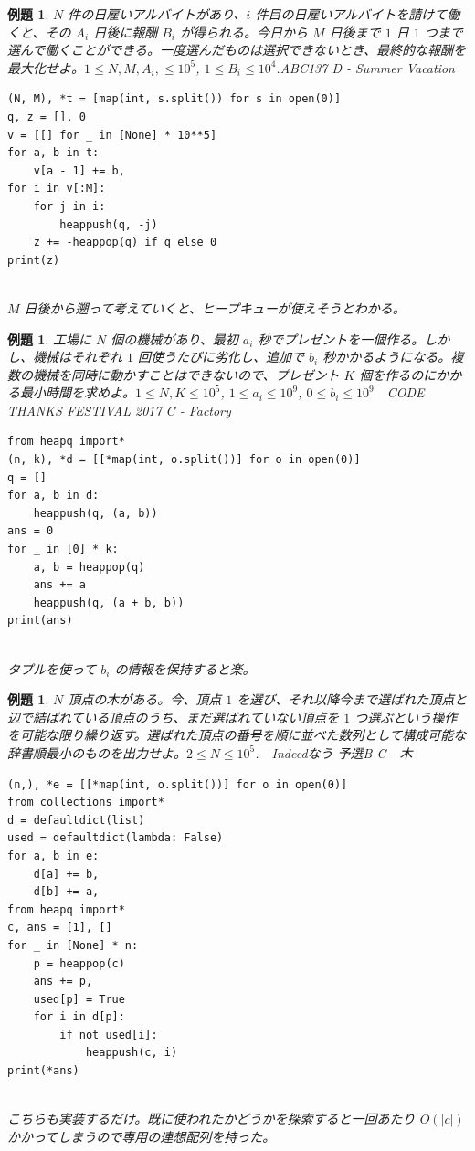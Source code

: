 \documentclass[12pt, a4j]{ltjsarticle}
\newtheorem{exm}[thm]{例題}
\newcommand*{\SS}{\vspace{1cm}}
\begin{document}
\SS

\begin{exm} \upshape$N$ 件の日雇いアルバイトがあり、$i$ 件目の日雇いアルバイトを請けて働くと、その $A_i$ 日後に報酬 $B_i$ が得られる。今日から $M$ 日後まで $1$ 日 $1$ つまで選んで働くことができる。一度選んだものは選択できないとき、最終的な報酬を最大化せよ。$1\le N,M,A_i,\le 10^5$, $1\le B_i\le 10^4$.ABC137 D - Summer Vacation\\
\begin{lstlisting}
(N, M), *t = [map(int, s.split()) for s in open(0)]
q, z = [], 0
v = [[] for _ in [None] * 10**5]
for a, b in t:
    v[a - 1] += b,
for i in v[:M]:
    for j in i:
        heappush(q, -j)
    z += -heappop(q) if q else 0
print(z)
\end{lstlisting}\quad\\
$M$ 日後から遡って考えていくと、ヒープキューが使えそうとわかる。
\end{exm}

\newpage

\begin{exm}\upshape
工場に $N$ 個の機械があり、最初 $a_i$ 秒でプレゼントを一個作る。しかし、機械はそれぞれ $1$ 回使うたびに劣化し、追加で $b_i$ 秒かかるようになる。複数の機械を同時に動かすことはできないので、プレゼント $K$ 個を作るのにかかる最小時間を求めよ。$1\le N,K\le 10^5$, $1\le a_i\le 10^9$, $0\le b_i\le 10^9$　CODE THANKS FESTIVAL 2017 C - Factory\\
\begin{lstlisting}
from heapq import*
(n, k), *d = [[*map(int, o.split())] for o in open(0)]
q = []
for a, b in d:
    heappush(q, (a, b))
ans = 0
for _ in [0] * k:
    a, b = heappop(q)
    ans += a
    heappush(q, (a + b, b))
print(ans)
\end{lstlisting}\quad\\
タプルを使って $b_i$ の情報を保持すると楽。
\end{exm}

\SS

\begin{exm} \upshape $N$ 頂点の木がある。今、頂点 $1$ を選び、それ以降今まで選ばれた頂点と辺で結ばれている頂点のうち、まだ選ばれていない頂点を $1$ つ選ぶという操作を可能な限り繰り返す。選ばれた頂点の番号を順に並べた数列として構成可能な辞書順最小のものを出力せよ。$2\le N\le 10^5$.　Indeedなう 予選B C - 木\\
\begin{lstlisting}
(n,), *e = [[*map(int, o.split())] for o in open(0)]
from collections import*
d = defaultdict(list)
used = defaultdict(lambda: False)
for a, b in e:
    d[a] += b,
    d[b] += a,
from heapq import*
c, ans = [1], []
for _ in [None] * n:
    p = heappop(c)
    ans += p,
    used[p] = True
    for i in d[p]:
        if not used[i]:
            heappush(c, i)
print(*ans)
\end{lstlisting}\quad\\
こちらも実装するだけ。既に使われたかどうかを探索すると一回あたり $O(|c|)$ かかってしまうので専用の連想配列を持った。
\end{exm}
\end{document}
